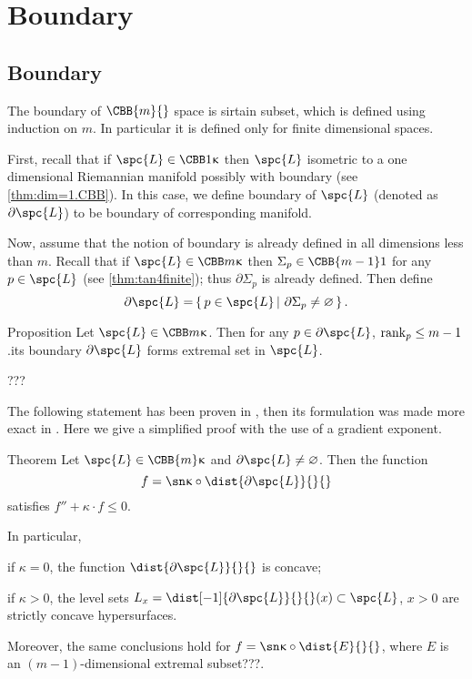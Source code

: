 \chapter{Boundary}


\section{Boundary}\label{sec:bry}

The boundary of $\CBB{m}{}$ space is sirtain subset,
which is defined using induction on $m$.
In particular it is defined only for finite dimensional spaces.

First, recall that if $\spc{L}\in\CBB 1\kappa$ then $\spc{L}$ isometric to a one dimensional Riemannian manifold possibly with boundary (see \ref{thm:dim=1.CBB}).
In this case, we define boundary of $\spc{L}$ (denoted as $\partial \spc{L}$) to be boundary of corresponding manifold.

Now, assume that the notion of boundary is already defined in all dimensions less than $m$.
Recall that if $\spc{L}\in\CBB m\kappa$ then $\Sigma_p\in\CBB{m-1}1$ for any $p\in \spc{L}$ (see \ref{thm:tan4finite});
thus $\partial\Sigma_p$ is already defined.
Then define 
\[\partial \spc{L}=\set{p\in \spc{L}}{\partial\Sigma_p\not=\emptyset}.\]


\begin{thm}{Proposition}
Let $\spc{L}\in\CBB m\kappa$.
Then for any $p\in\partial\spc{L}$, $\rank_p\le m-1$.its boundary $\partial \spc{L}$ forms extremal set in $\spc{L}$. 
\end{thm}

???\qeds


The following statement has been proven in \cite{perelman:spaces2}, then its
formulation was made more exact in \cite{alexander-bishop:fk}. 
Here we give a simplified proof with the use of a gradient exponent.

\begin{thm}{Theorem} \label{thm:dist-to-bry} 
Let $\spc{L}\in\CBB{m}\kappa$ and
$\partial \spc{L}\not=\emptyset$.
Then the function 
\[f=\sn\kappa\circ\dist{\partial \spc{L}}{}{}\] 
satisfies $f''+\kappa\cdot  f\le 0$.

In particular,
\begin{subthm}{} if $\kappa=0$, the function $\dist{\partial \spc{L}}{}{}$ is concave;
\end{subthm}

\begin{subthm}{} if $\kappa>0$, the level sets $L_x=\dist[-1]{\partial \spc{L}}{}{}(x)\subset \spc{L}$, $x>0$
are strictly concave hypersurfaces.
\end{subthm}

Moreover, the same conclusions hold for $f=\sn\kappa\circ\dist{E}{}{}$, where $E$ is an $(m-1)$-dimensional extremal subset???.
\end{thm}

